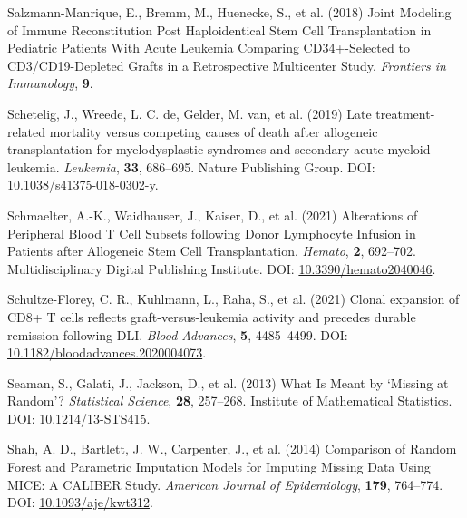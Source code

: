 \documentclass[
  letterpaper,
  DIV=11,
  numbers=noendperiod]{scrreprt}
\newlength{\cslhangindent}
\newenvironment{CSLReferences}[2] %
 {\begin{list}{}{%
  \setlength{\itemindent}{0pt}
  \setlength{\leftmargin}{0pt}
  \setlength{\parsep}{0pt}
  \ifodd #1
   \setlength{\leftmargin}{\cslhangindent}
   \setlength{\itemindent}{-1\cslhangindent}
  \fi
  \setlength{\itemsep}{#2\baselineskip}}}
 {\end{list}}
\begin{document}
\begin{CSLReferences}{1}{1}
Salzmann-Manrique, E., Bremm, M., Huenecke, S., et al. (2018) Joint
{Modeling} of {Immune Reconstitution Post Haploidentical Stem Cell
Transplantation} in {Pediatric Patients With Acute Leukemia Comparing
CD34}+-{Selected} to {CD3}/{CD19-Depleted Grafts} in a {Retrospective
Multicenter Study}. \emph{Frontiers in Immunology}, \textbf{9}.

Schetelig, J., Wreede, L. C. de, Gelder, M. van, et al. (2019) Late
treatment-related mortality versus competing causes of death after
allogeneic transplantation for myelodysplastic syndromes and secondary
acute myeloid leukemia. \emph{Leukemia}, \textbf{33}, 686--695. Nature
Publishing Group. DOI:
\href{https://doi.org/10.1038/s41375-018-0302-y}{10.1038/s41375-018-0302-y}.

Schmaelter, A.-K., Waidhauser, J., Kaiser, D., et al. (2021) Alterations
of {Peripheral Blood T Cell Subsets} following {Donor Lymphocyte
Infusion} in {Patients} after {Allogeneic Stem Cell Transplantation}.
\emph{Hemato}, \textbf{2}, 692--702. Multidisciplinary Digital
Publishing Institute. DOI:
\href{https://doi.org/10.3390/hemato2040046}{10.3390/hemato2040046}.

Schultze-Florey, C. R., Kuhlmann, L., Raha, S., et al. (2021) Clonal
expansion of {CD8}+ {T} cells reflects graft-versus-leukemia activity
and precedes durable remission following {DLI}. \emph{Blood Advances},
\textbf{5}, 4485--4499. DOI:
\href{https://doi.org/10.1182/bloodadvances.2020004073}{10.1182/bloodadvances.2020004073}.

Seaman, S., Galati, J., Jackson, D., et al. (2013) What {Is Meant} by
{`{Missing} at {Random}'}? \emph{Statistical Science}, \textbf{28},
257--268. Institute of Mathematical Statistics. DOI:
\href{https://doi.org/10.1214/13-STS415}{10.1214/13-STS415}.

Shah, A. D., Bartlett, J. W., Carpenter, J., et al. (2014) Comparison of
{Random Forest} and {Parametric Imputation Models} for {Imputing Missing
Data Using MICE}: {A CALIBER Study}. \emph{American Journal of
Epidemiology}, \textbf{179}, 764--774. DOI:
\href{https://doi.org/10.1093/aje/kwt312}{10.1093/aje/kwt312}.


\end{CSLReferences}
\end{document}
